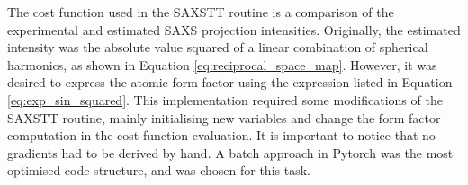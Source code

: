 The cost function used in the SAXSTT routine is a comparison of the experimental and estimated SAXS projection intensities.
Originally, the estimated intensity was the absolute value squared of a linear combination of spherical harmonics, as shown in Equation \eqref{eq:reciprocal_space_map}.
However, it was desired to express the atomic form factor using the expression listed in Equation \eqref{eq:exp_sin_squared}.
This implementation required some modifications of the SAXSTT routine, mainly initialising new variables and change the form factor computation in the cost function evaluation.
It is important to notice that no gradients had to be derived by hand.
A batch approach in Pytorch was the most optimised code structure, and was chosen for this task.


